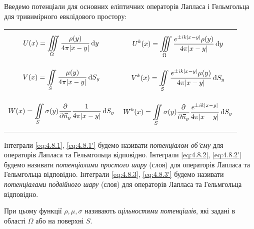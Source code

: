 Введемо потенціали для основних еліптичних операторів Лапласа і Гельмгольца для тривимірного евклідового простору: 
\begin{longtable}{p{} p{}}
	\parbox{.5\textwidth}{\begin{equation}
		\label{eq:4.8.1}
		U(x) = \displaystyle\iiint\limits_\Omega \frac{\rho(y)}{4 \pi |x - y|} \mathop{}\!\mathrm{d} y
	\end{equation}} & \parbox{.5\textwidth}{\begin{equation}
		\label{eq:4.8.1'}
		U^k(x) = \displaystyle\iiint\limits_\Omega \frac{e^{\pm i k |x - y|} \rho(y)}{4 \pi |x - y|} \mathop{}\!\mathrm{d} y
	\end{equation}} \\
	\parbox{.5\textwidth}{\begin{equation}
		\label{eq:4.8.2}
		V(x) = \displaystyle\iint\limits_S \frac{\mu(y)}{4 \pi |x - y|} \mathop{}\!\mathrm{d} S_y
	\end{equation}} & \parbox{.5\textwidth}{\begin{equation}
		\label{eq:4.8.2'}
		V^k(x) = \displaystyle\iint\limits_S \frac{e^{\pm i k |x - y|} \mu(y)}{4 \pi |x - y|} \mathop{}\!\mathrm{d} S_y
	\end{equation}} \\
	\parbox{.5\textwidth}{\begin{equation}
		\label{eq:4.8.3}
		W(x) = \displaystyle\iint\limits_S \sigma(y) \frac{\partial}{\partial \vec n_y} \frac{1}{4 \pi |x - y|} \mathop{}\!\mathrm{d} S_y
	\end{equation}} & \parbox{.5\textwidth}{\begin{equation}
		\label{eq:4.8.3'}
		W^k(x) = \displaystyle\iint\limits_S \sigma(y) \frac{\partial}{\partial \vec n_y} \frac{e^{\pm i k |x - y|}}{4 \pi |x - y|} \mathop{}\!\mathrm{d} S_y
	\end{equation}}
\end{longtable}

\begin{definition}
	Інтеграли \eqref{eq:4.8.1}, \eqref{eq:4.8.1'} будемо називати \textit{потенціалом об'єму} для операторів Лапласа та Гельмгольца відповідно. Інтеграли \eqref{eq:4.8.2}, \eqref{eq:4.8.2'} будемо називати \textit{потенціалами простого шару} (слоя) для операторів Лапласа та Гельмгольца відповідно. Інтеграли \eqref{eq:4.8.3}, \eqref{eq:4.8.3'} будемо називати \textit{потенціалами подвійного шару} (слоя) для операторів Лапласа та Гельмгольца відповідно.
\end{definition}

\begin{definition}
	При цьому функції $\rho, \mu, \sigma$ називають \textit{щільностями потенціалів}, які задані в області $\Omega$ або на поверхні $S$.
\end{definition}

